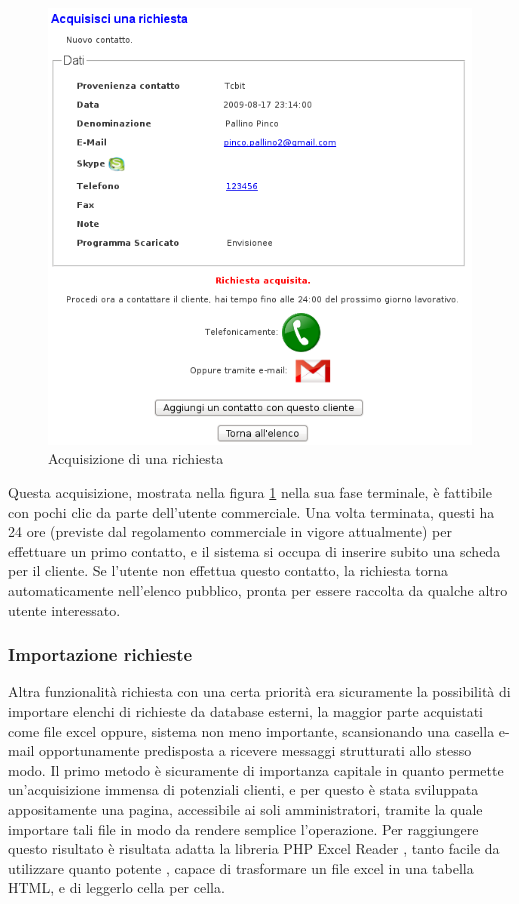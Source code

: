 \begin{figure}[!ht]
\centering
  \includegraphics[scale=0.6]{./images/acquisisciScreen.png}
\caption{Acquisizione di una richiesta}
\label{acq_richieste}
\end{figure}

\noindent
\newpage
Questa acquisizione, mostrata nella figura \ref{acq_richieste} nella sua fase terminale, \`e fattibile con pochi clic da parte dell'utente commerciale. Una volta terminata, questi ha 24 ore (previste dal regolamento commerciale in vigore attualmente) per effettuare un primo contatto, e il sistema si occupa di inserire subito una scheda per il cliente. Se l'utente non effettua questo contatto, la richiesta torna automaticamente nell'elenco pubblico, pronta per essere raccolta da qualche altro utente interessato.


\newpage
\subsubsection{Importazione richieste}
Altra funzionalit\`a richiesta con una certa priorit\`a era sicuramente la possibilit\`a di importare elenchi di richieste da database esterni, la maggior parte acquistati come file excel oppure, sistema non meno importante, scansionando una casella e-mail opportunamente predisposta a ricevere messaggi strutturati allo stesso modo.
Il primo metodo \`e sicuramente di importanza capitale in quanto permette un'acquisizione immensa di potenziali clienti, e per questo \`e stata sviluppata appositamente una pagina, accessibile ai soli amministratori, tramite la quale importare tali file in modo da rendere semplice l'operazione. Per raggiungere questo risultato \`e risultata adatta la libreria PHP Excel Reader \cite{excel reader}, tanto facile da utilizzare quanto potente \cite{cinque}, capace di trasformare un file excel in una tabella HTML, e di leggerlo cella per cella.

